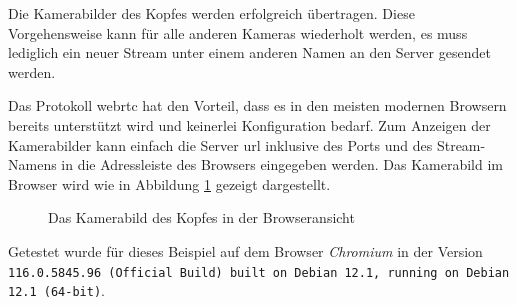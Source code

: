 \noindent Die Kamerabilder des Kopfes werden erfolgreich übertragen.
Diese Vorgehensweise kann für alle anderen Kameras wiederholt werden, es muss lediglich ein neuer Stream unter einem anderen
Namen an den Server gesendet werden.


Das Protokoll \gls{webrtc} hat den Vorteil, dass es in den meisten modernen Browsern bereits unterstützt wird und
keinerlei Konfiguration bedarf.
Zum Anzeigen der Kamerabilder kann einfach die Server \gls{url} inklusive des Ports und des Stream-Namens in die
Adressleiste des Browsers eingegeben werden.
Das Kamerabild im Browser wird wie in Abbildung \ref{fig:browser} gezeigt dargestellt.

\begin{figure}[h]
    \caption{Das Kamerabild des Kopfes in der Browseransicht}\label{fig:browser}
\end{figure}

\noindent Getestet wurde für dieses Beispiel auf dem Browser \emph{Chromium} in der Version
\texttt{116.0.5845.96 (Official Build) built on Debian 12.1, running on Debian 12.1 (64-bit)}.


